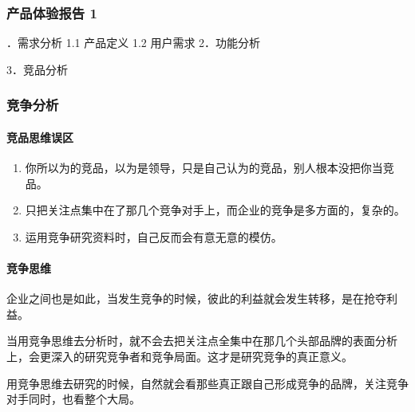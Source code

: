 \documentclass[letterpaper,11pt,english]{sphinxmanual}
\begin{document}
\subsubsection{产品体验报告 1\sphinxfootnotemark[171]}
\label{\detokenize{chapter_skill/experience_report:id1}}\label{\detokenize{chapter_skill/experience_report::doc}}%
\begin{footnotetext}[171]\sphinxAtStartFootnote
{}
%
\end{footnotetext}．需求分析 1.1 产品定义 1.2 用户需求 2．功能分析

3．竞品分析


\subsubsection{竞争分析}
\label{\detokenize{chapter_skill/compete_analysis:id1}}\label{\detokenize{chapter_skill/compete_analysis::doc}}

\paragraph{竞品思维误区}
\label{\detokenize{chapter_skill/compete_analysis:id2}}\begin{enumerate}
%
\item {} 
你所以为的竞品，以为是领导，只是自己认为的竞品，别人根本没把你当竞品。

\item {} 
只把关注点集中在了那几个竞争对手上，而企业的竞争是多方面的，复杂的。

\item {} 
运用竞争研究资料时，自己反而会有意无意的模仿。

\end{enumerate}


\paragraph{竞争思维}
\label{\detokenize{chapter_skill/compete_analysis:id3}}
企业之间也是如此，当发生竞争的时候，彼此的利益就会发生转移，是在抢夺利益。

当用竞争思维去分析时，就不会去把关注点全集中在那几个头部品牌的表面分析上，会更深入的研究竞争者和竞争局面。这才是研究竞争的真正意义。

用竞争思维去研究的时候，自然就会看那些真正跟自己形成竞争的品牌，关注竞争对手同时，也看整个大局。
\end{document}
